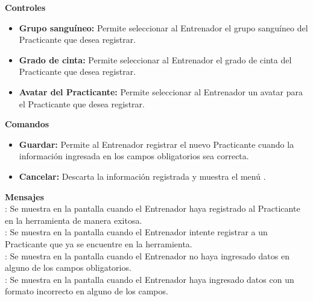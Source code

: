 \textbf{\textcolor[rgb]{0, 0, 0.545098}{Controles}}
\begin{itemize}
	\item \textbf{\textcolor[rgb]{0, 0, 0.545098}{Grupo sanguíneo:}} Permite seleccionar al Entrenador el grupo sanguíneo del Practicante que desea registrar.
	\item \textbf{\textcolor[rgb]{0, 0, 0.545098}{Grado de cinta:}} Permite seleccionar al Entrenador el grado de cinta del Practicante que desea registrar.
	\item \textbf{\textcolor[rgb]{0, 0, 0.545098}{Avatar del Practicante:}} Permite seleccionar al Entrenador un avatar para el Practicante que desea registrar.
\end{itemize}
\vspace{1em}

\textbf{\textcolor[rgb]{0, 0, 0.545098}{Comandos}}
\begin{itemize}
	\item \textbf{\textcolor[rgb]{0, 0, 0.545098}{Guardar:}} Permite al Entrenador registrar el nuevo Practicante cuando la información ingresada en los campos obligatorios sea correcta.
	\item \textbf{\textcolor[rgb]{0, 0, 0.545098}{Cancelar:}} Descarta la información registrada y muestra el menú .
\end{itemize}
\vspace{1em}

\textbf{\textcolor[rgb]{0, 0, 0.545098}{Mensajes}}\\

\textbf{}: Se muestra en la pantalla  cuando el Entrenador haya registrado al Practicante en la herramienta de manera exitosa.\\

\textbf{}: Se muestra en la pantalla  cuando el Entrenador intente registrar a un Practicante que ya se encuentre en la herramienta.\\

\textbf{}: Se muestra en la pantalla  cuando el Entrenador no haya ingresado datos en alguno de los campos obligatorios.\\

\textbf{}: Se muestra en la pantalla  cuando el Entrenador haya ingresado datos con un formato incorrecto en alguno de los campos.\\

\clearpage